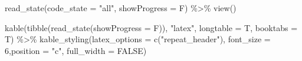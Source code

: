 \documentclass[
  brazilian,
]{book}
\newenvironment{Shaded}{\begin{snugshade}}{\end{snugshade}}
\newcommand{\AttributeTok}[1]{\textcolor[rgb]{0.77,0.63,0.00}{#1}}
\newcommand{\ConstantTok}[1]{\textcolor[rgb]{0.00,0.00,0.00}{#1}}
\newcommand{\DecValTok}[1]{\textcolor[rgb]{0.00,0.00,0.81}{#1}}
\newcommand{\FunctionTok}[1]{\textcolor[rgb]{0.00,0.00,0.00}{#1}}
\newcommand{\NormalTok}[1]{#1}
\newcommand{\SpecialCharTok}[1]{\textcolor[rgb]{0.00,0.00,0.00}{#1}}
\newcommand{\StringTok}[1]{\textcolor[rgb]{0.31,0.60,0.02}{#1}}
\begin{document}
\begin{Shaded}
\begin{Highlighting}[]
\FunctionTok{read\_state}\NormalTok{(}\AttributeTok{code\_state =} \StringTok{"all"}\NormalTok{,}
           \AttributeTok{showProgress =}\NormalTok{ F) }\SpecialCharTok{\%\textgreater{}\%} \FunctionTok{view}\NormalTok{()}
\end{Highlighting}
\end{Shaded}

\begin{Shaded}
\begin{Highlighting}[]
\FunctionTok{kable}\NormalTok{(}\FunctionTok{tibble}\NormalTok{(}\FunctionTok{read\_state}\NormalTok{(}\AttributeTok{showProgress =}\NormalTok{ F)), }\StringTok{"latex"}\NormalTok{, }\AttributeTok{longtable =}\NormalTok{ T, }\AttributeTok{booktabs =}\NormalTok{ T) }\SpecialCharTok{\%\textgreater{}\%}
  \FunctionTok{kable\_styling}\NormalTok{(}\AttributeTok{latex\_options =} \FunctionTok{c}\NormalTok{(}\StringTok{"repeat\_header"}\NormalTok{), }\AttributeTok{font\_size =} \DecValTok{6}\NormalTok{,}\AttributeTok{position =} \StringTok{"c"}\NormalTok{, }\AttributeTok{full\_width =} \ConstantTok{FALSE}\NormalTok{)}
\end{Highlighting}
\end{Shaded}

\begingroup\fontsize{6}{8}\selectfont
\end{document}
